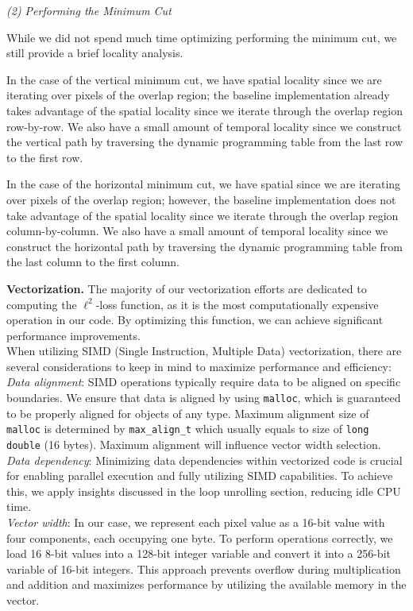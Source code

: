 \documentclass[letterpaper]{article}
\newcommand{\mypar}[1]{{\bf #1.}}
\begin{document}
\textit{(2) Performing the Minimum Cut}

While we did not spend much time optimizing performing the minimum cut, we still provide a brief locality analysis.

In the case of the vertical minimum cut, we have spatial locality since we are iterating over pixels of the overlap region; the baseline implementation already takes advantage of the spatial locality since we iterate through the overlap region row-by-row. We also have a small amount of temporal locality since we construct the vertical path by traversing the dynamic programming table from the last row to the first row.

In the case of the horizontal minimum cut, we have spatial since we are iterating over pixels of the overlap region; however, the baseline implementation does not take advantage of the spatial locality since we iterate through the overlap region column-by-column. We also have a small amount of temporal locality since we construct the horizontal path by traversing the dynamic programming table from the last column to the first column.

\mypar{Vectorization}
The majority of our vectorization efforts are dedicated to computing the $\ell^2$-loss function, as it is the most computationally expensive operation in our code. By optimizing this function, we can achieve significant performance improvements. \\
When utilizing SIMD (Single Instruction, Multiple Data) vectorization, there are several considerations to keep in mind to maximize performance and efficiency: \\ 
\textit{Data alignment}: SIMD operations typically require data to be aligned on specific boundaries. We ensure that data is aligned by using \texttt{malloc}, which is guaranteed to be properly aligned for objects of any type. Maximum alignment size of \texttt{malloc} is determined by \texttt{max\_align\_t} which usually equals to size of \texttt{long double} (16 bytes). Maximum alignment will influence vector width selection.  \\
\textit{Data dependency}: Minimizing data dependencies within vectorized code is crucial for enabling parallel execution and fully utilizing SIMD capabilities. To achieve this, we apply insights discussed in the loop unrolling section, reducing idle CPU time. \\
\textit{Vector width}: In our case, we represent each pixel value as a 16-bit value with four components, each occupying one byte. To perform operations correctly, we load 16 8-bit values into a 128-bit integer variable and convert it into a 256-bit variable of 16-bit integers. This approach prevents overflow during multiplication and addition and maximizes performance by utilizing the available memory in the vector.\\
\end{document}
